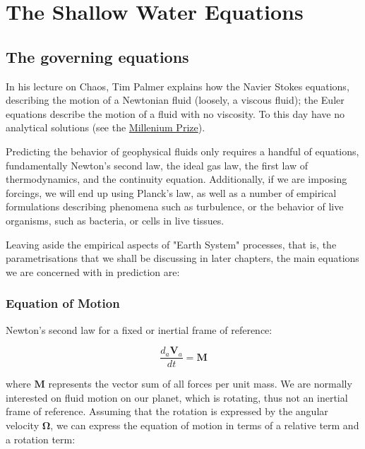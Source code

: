 \newpage
{} %
\chapter{The Shallow Water Equations}

\vspace{1em}


\section{The governing equations}

In his lecture on Chaos, Tim Palmer explains how the Navier Stokes equations, describing the motion of a Newtonian fluid (loosely, a viscous fluid); the Euler equations describe the motion of a fluid with no viscosity. To this day have no analytical solutions (see the \href{https://en.wikipedia.org/wiki/Millennium_Prize_Problems}{Millenium Prize}). 

Predicting the behavior of geophysical fluids only requires a handful of equations, fundamentally Newton's second law, the ideal gas law, the first law of thermodynamics, and the continuity equation. Additionally, if we are imposing forcings, we will end up using Planck's law, as well as a number of empirical formulations describing phenomena such as turbulence, or the behavior of live organisms, such as bacteria, or cells in live tissues.

Leaving aside the empirical aspects of "Earth System" processes, that is, the parametrisations that we shall be discussing in later chapters, the main equations we are concerned with in prediction are:

\subsection{Equation of Motion}

Newton's second law for a fixed or inertial frame of reference:

\begin{equation}
	\frac{d_a \bm{V}_a}{dt}=\bm{M}
\end{equation}

where $\bm{M}$ represents the vector sum of all forces per unit mass. We are normally interested on fluid motion on our planet, which is rotating, thus not an inertial frame of reference. Assuming that the rotation is expressed by the angular velocity $\bm{\Omega}$, we can express the equation of motion in terms of a relative term and a rotation term:

